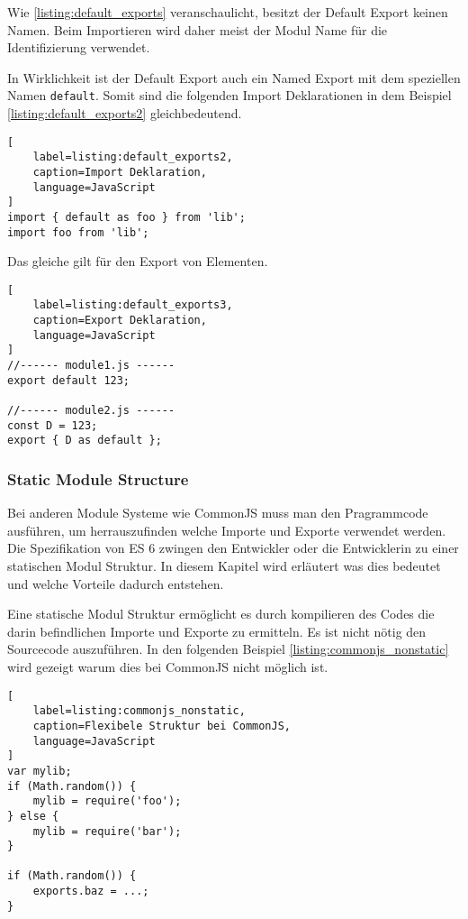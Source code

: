 Wie \ref{listing:default_exports} veranschaulicht, besitzt der Default Export keinen Namen. Beim Importieren wird daher meist der Modul Name für die Identifizierung verwendet.

In Wirklichkeit ist der Default Export auch ein Named Export mit dem speziellen Namen \lstinline{default}. Somit sind die folgenden Import Deklarationen in dem Beispiel \ref{listing:default_exports2} gleichbedeutend. \autocite{Rauschmayer2014}

 \begin{lstlisting}[
    label=listing:default_exports2,
    caption=Import Deklaration,
	language=JavaScript
]
import { default as foo } from 'lib';
import foo from 'lib';
\end{lstlisting}

Das gleiche gilt für den Export von Elementen.

\begin{lstlisting}[
    label=listing:default_exports3,
    caption=Export Deklaration,
	language=JavaScript
]
//------ module1.js ------
export default 123;

//------ module2.js ------
const D = 123;
export { D as default };
\end{lstlisting}

\subsubsection{Static Module Structure}
Bei anderen Module Systeme wie CommonJS muss man den Pragrammcode ausführen, um herrauszufinden welche Importe und Exporte verwendet werden. Die Spezifikation von ES 6 zwingen den Entwickler oder die Entwicklerin zu einer statischen Modul Struktur. In diesem Kapitel wird erläutert was dies bedeutet und welche Vorteile dadurch entstehen.
\autocite{Rauschmayer2014}

Eine statische Modul Struktur ermöglicht es durch kompilieren des Codes die darin befindlichen Importe und Exporte zu ermitteln. Es ist nicht nötig den Sourcecode auszuführen. In den folgenden Beispiel \ref{listing:commonjs_nonstatic} wird gezeigt warum dies bei CommonJS nicht möglich ist. \autocite{Rauschmayer2014}

\begin{lstlisting}[
    label=listing:commonjs_nonstatic,
    caption=Flexibele Struktur bei CommonJS,
	language=JavaScript
]
var mylib;
if (Math.random()) {
    mylib = require('foo');
} else {
    mylib = require('bar');
}

if (Math.random()) {
    exports.baz = ...;
}
\end{lstlisting}

